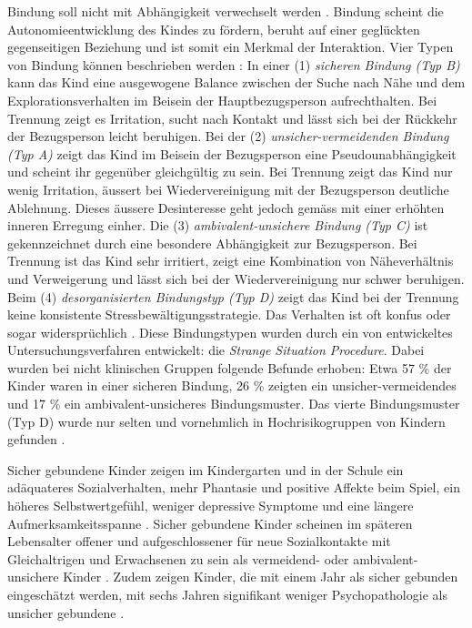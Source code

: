 Bindung soll nicht mit Abhängigkeit verwechselt werden \cite{Schmidt1996}. Bindung scheint die Autonomieentwicklung des Kindes zu fördern, beruht auf einer geglückten gegenseitigen Beziehung und ist somit ein Merkmal der Interaktion. Vier Typen von Bindung können beschrieben werden \cite{Resch1999}: In einer (1) \textit{sicheren Bindung (Typ B)} kann das Kind eine ausgewogene Balance zwischen der Suche nach Nähe und dem Explorationsverhalten im Beisein der Hauptbezugsperson aufrechthalten. Bei Trennung zeigt es Irritation, sucht nach Kontakt und lässt sich bei der Rückkehr der Bezugsperson leicht beruhigen. Bei der (2) \textit{unsicher-vermeidenden Bindung (Typ A)} zeigt das Kind im Beisein der Bezugsperson eine Pseudounabhängigkeit und scheint ihr gegenüber gleichgültig zu sein. Bei Trennung zeigt das Kind nur wenig Irritation, äussert bei Wiedervereinigung mit der Bezugsperson deutliche Ablehnung. Dieses äussere Desinteresse geht jedoch gemäss  mit einer erhöhten inneren Erregung einher. Die (3) \textit{ambivalent-unsichere Bindung (Typ C)} ist gekennzeichnet durch eine besondere Abhängigkeit zur Bezugsperson. Bei Trennung ist das Kind sehr irritiert, zeigt eine Kombination von Näheverhältnis und Verweigerung und lässt sich bei der Wiedervereinigung nur schwer beruhigen. Beim (4) \textit{desorganisierten Bindungstyp (Typ D)} zeigt das Kind bei der Trennung keine konsistente Stressbewältigungsstrategie. Das Verhalten ist oft konfus oder sogar widersprüchlich \cite{Siegler2008}. Diese Bindungstypen wurden durch ein von  entwickeltes Untersuchungsverfahren entwickelt: die \textit{Strange Situation Procedure}. Dabei wurden bei nicht klinischen Gruppen folgende Befunde erhoben: Etwa 57 \% der Kinder waren in einer sicheren Bindung, 26 \% zeigten ein unsicher-vermeidendes und 17 \% ein ambivalent-unsicheres Bindungsmuster. Das vierte Bindungsmuster (Typ D) wurde nur selten und vornehmlich in Hochrisikogruppen von Kindern gefunden \cite{Resch1999}.

Sicher gebundene Kinder zeigen im Kindergarten und in der Schule ein adäquateres Sozialverhalten, mehr Phantasie und positive Affekte beim Spiel, ein höheres Selbstwertgefühl, weniger depressive Symptome und eine längere Aufmerksamkeitsspanne \cite{Dornes1993, Zeanah1994}. Sicher gebundene Kinder scheinen im späteren Lebensalter offener und aufgeschlossener für neue Sozialkontakte mit Gleichaltrigen und Erwachsenen zu sein als vermeidend- oder ambivalent-unsichere Kinder \cite{Resch1999}. Zudem zeigen Kinder, die mit einem Jahr als sicher gebunden eingeschätzt werden, mit sechs Jahren signifikant weniger Psychopathologie als unsicher gebundene \cite{Lewis1984}.

